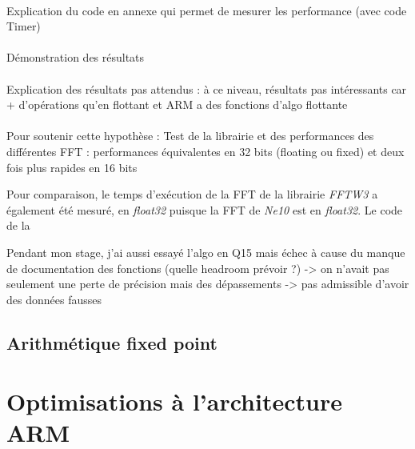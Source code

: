 \documentclass{article}
\begin{document}
    \paragraph{}
    Explication du code en annexe qui permet de mesurer les performance (avec code Timer)

    \paragraph{}
    Démonstration des résultats

    \paragraph{}
    Explication des résultats pas attendus : à ce niveau, résultats pas intéressants car + d'opérations qu'en flottant et ARM a des fonctions d'algo flottante

    \paragraph{}
    Pour soutenir cette hypothèse :  Test de la librairie et des performances des différentes FFT : performances équivalentes en 32 bits (floating ou fixed) et deux fois plus rapides en 16 bits


    Pour comparaison, le temps d'exécution de la FFT de la librairie \emph{FFTW3} a également été mesuré, en \emph{float32} puisque la FFT de \emph{Ne10} est en \emph{float32}. Le code de la 

    Pendant mon stage, j'ai aussi essayé l'algo en Q15 mais échec à cause du manque de documentation des fonctions (quelle headroom prévoir ?) -> on n'avait pas seulement une perte de précision mais des dépassements -> pas admissible d'avoir des données fausses




    \subsection{Arithmétique fixed point}
 




    \section{Optimisations à l'architecture ARM}
\end{document}
